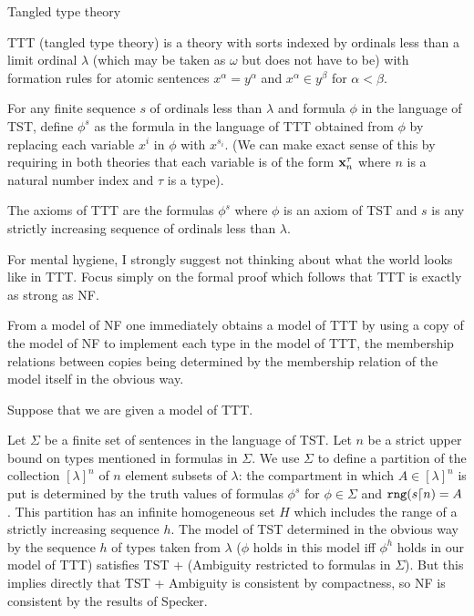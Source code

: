 \documentclass{slides}
\begin{document}
\begin{slide}

{\Large Tangled type theory}

TTT (tangled type theory) is a theory with sorts indexed by ordinals less than a limit ordinal $\lambda$ (which may be taken as $\omega$ but does not have to be) with formation rules
for atomic sentences $x^{\alpha} = y^{\alpha}$ and $x^{\alpha} \in y^{\beta}$ for $\alpha<\beta$.

For any finite sequence $s$ of ordinals less than $\lambda$ and formula $\phi$ in the language of TST, define $\phi^s$ as the formula in the language of TTT obtained from $\phi$ by replacing each variable $x^i$ in $\phi$ with $x^{s_i}$. (We can make exact sense of this by requiring in both theories that each variable is of the form ${\bf x}_n^{\tau}$ where $n$ is a natural number index and $\tau$ is a type).

The axioms of TTT are the formulas $\phi^s$ where $\phi$ is an axiom of TST and $s$ is any strictly increasing sequence of ordinals less than $\lambda$.

\end{slide}

\begin{slide}

For mental hygiene, I strongly suggest not thinking about what the world looks like in TTT.  Focus simply on the formal proof which follows that TTT is exactly as strong as NF.

\end{slide}

\begin{slide}

From a model of NF one immediately obtains a model of TTT by using a copy of the model of NF to implement each type in the model of TTT, the membership relations between copies being determined by the membership relation of the model itself in the obvious way.

\end{slide}

\begin{slide}

Suppose that we are given a model of TTT.

Let $\Sigma$ be a finite set of sentences in the language of TST.  Let $n$ be a strict upper bound on types mentioned in formulas in $\Sigma$.  We use $\Sigma$ to define a partition of the collection $[\lambda]^n$ of $n$ element subsets of $\lambda$:  the compartment in which $A \in [\lambda]^n$ is  put is determined by the truth values of formulas $\phi^s$ for
$\phi \in \Sigma$ and ${\tt rng}(s \lceil n) = A$.  This partition has an infinite homogeneous set $H$ which includes the range of a strictly increasing sequence $h$.  The model of TST determined in the obvious way by the sequence $h$ of types taken from $\lambda$ ($\phi$ holds in this model iff $\phi^h$ holds in our model of TTT) satisfies TST + (Ambiguity restricted to formulas in $\Sigma$).  But this implies directly that TST + Ambiguity is consistent by compactness, so NF is consistent by the results of Specker.

\end{slide}
\end{document}
